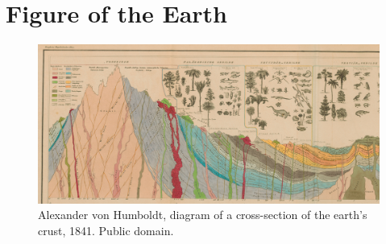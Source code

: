 
\chapter{Figure of the Earth}

\begin{figure}[ht]
    \vspace{-45pt}
        \includegraphics[width=\linewidth]{../../pictures/Alexander_von_Humboldt_-_1841_-_Diagram_of_a_cross-section_of_the_earth's_crust-small-2.png}
        \captionsetup{width = \linewidth}
        \caption{\footnotesize Alexander von Humboldt, diagram of a cross-section of the earth's crust, 1841. Public domain.}
\end{figure}
\clearpage

